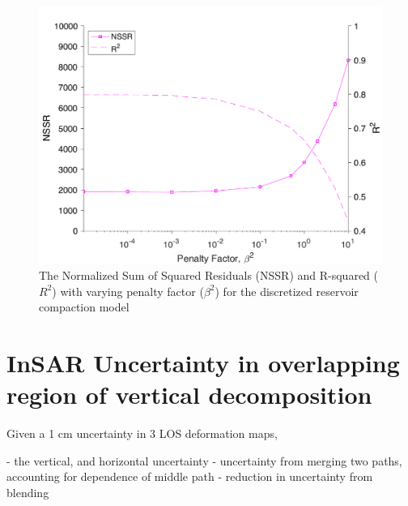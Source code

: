 \documentclass{utexasthesis}
\begin{document}
\begin{figure}
	\centering
	\includegraphics[width=\textwidth]{paper1-permian/figures/supplement/figureS12-reservoir-nssr.pdf}
	\caption{The Normalized Sum of Squared Residuals (NSSR) and R-squared ($ R^2 $) with varying penalty factor ($ \beta^2 $) for the discretized reservoir compaction model
	}
	\label{fig:model-reservoir-nssr}
\end{figure}



\chapter{InSAR Uncertainty in overlapping region of vertical decomposition}

Given a 1 cm uncertainty in 3 LOS deformation maps,

- the vertical, and horizontal uncertainty
- uncertainty from merging two paths, accounting for dependence of middle path
- reduction in uncertainty from blending
\end{document}
